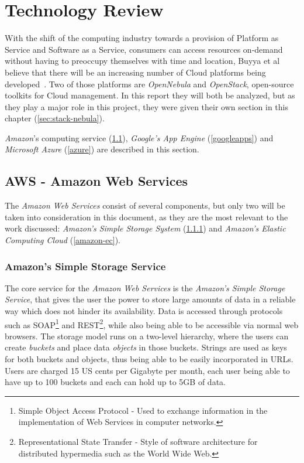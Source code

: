 \section{Technology Review}\label{sec:developments-apps-services}

With the shift of the computing industry towards a provision of Platform as Service and Software as a Service, consumers can access resources on-demand without having to preoccupy themselves with time and location, Buyya et al believe that there will be an increasing number of Cloud platforms being developed~\cite{Buyya2009599}. Two of those platforms are \textit{OpenNebula} and \textit{OpenStack}, open-source toolkits for Cloud management. In this report they will both be analyzed, but as they play a major role in this project, they were given their own section in this chapter (\ref{sec:stack-nebula}).

\textit{Amazon}'s computing service (\ref{aws}), \textit{Google's App Engine} (\ref{googleapps}) and \textit{Microsoft Azure} (\ref{azure}) are described in this section.

\subsection{AWS - Amazon Web Services}\label{aws}

The \textit{Amazon Web Services} consist of several components, but only two will be taken into consideration in this document, as they are the most relevant to the work discussed: \textit{Amazon's Simple Storage System} (\ref{amazon-sss}) and \textit{Amazon's Elastic Computing Cloud} (\ref{amazon-ec}).

\subsubsection{Amazon's Simple Storage Service}\label{amazon-sss}

The core service for the \textit{Amazon Web Services} is the \textit{Amazon's Simple Storage Service}, that gives the user the power to store large amounts of data in a reliable way which does not hinder its availability. Data is accessed through protocols such as SOAP\footnote{Simple Object Access Protocol - Used to exchange information in the implementation of Web Services in computer networks.} and REST\footnote{Representational State Transfer - Style of software architecture for distributed hypermedia such as the World Wide Web.}, while also being able to be accessible via normal web browsers.
The storage model runs on a two-level hierarchy, where the users can create \textit{buckets} and place data \textit{objects} in those buckets. Strings are used as keys for both buckets and objects, thus being able to be easily incorporated in URLs. Users are charged 15 US cents per Gigabyte per month, each user being able to have up to 100 buckets and each can hold up to 5GB of data.\cite{hazel}

